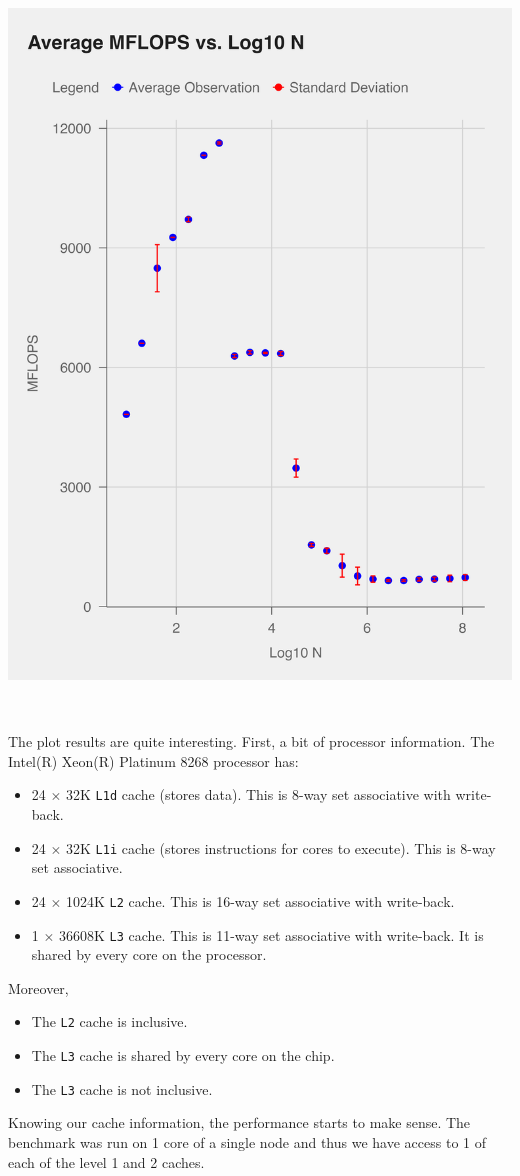 \documentclass{article}
\begin{document}
\begin{multicols}{2}
    \includegraphics[width=.45\textwidth]{../part2/data/part_2_plot.png}
    \columnbreak
    
    \ 

    \noindent The plot results are quite interesting. First, a bit of processor information. The Intel(R) Xeon(R) Platinum 8268 processor has: 
    \begin{itemize}
        \item 24 $\times$ 32K \texttt{L1d} cache (stores data). This is 8-way set associative with write-back.
        \item 24 $\times$ 32K \texttt{L1i} cache (stores instructions for cores to execute). This is 8-way set associative.
        \item 24 $\times$ 1024K \texttt{L2} cache. This is 16-way set associative with write-back.
        \item 1 $\times$ 36608K \texttt{L3} cache. This is 11-way set associative with write-back. It is shared by every core 
        on the processor.
    \end{itemize}
    Moreover, 
    \begin{itemize}
        \item The \texttt{L2} cache is inclusive.
        \item The \texttt{L3} cache is shared by every core on the chip. 
        \item The \texttt{L3} cache is not inclusive.
    \end{itemize}
\end{multicols}
\newpage
Knowing our cache information, the performance starts to make sense. The benchmark was run on 1 core of a single node and thus 
we have access to 1 of each of the level 1 and 2 caches. 
\end{document}
